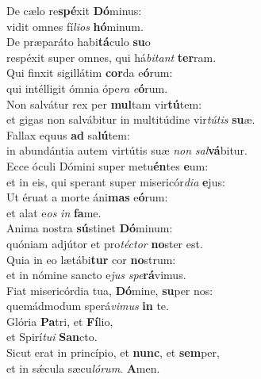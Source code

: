 \evenverse De cælo re\textbf{spé}xit \textbf{Dó}minus:~\*\\
\evenverse vidit omnes fí\textit{li}\textit{os} \textbf{hó}minum.\\
\oddverse De præparáto habi\textbf{tá}culo \textbf{su}o~\*\\
\oddverse respéxit super omnes, qui há\textit{bi}\textit{tant} \textbf{ter}ram.\\
\evenverse Qui finxit sigillátim \textbf{cor}da e\textbf{ó}rum:~\*\\
\evenverse qui intélligit ómnia ópe\textit{ra} \textit{e}\textbf{ó}rum.\\
\oddverse Non salvátur rex per \textbf{mul}tam vir\textbf{tú}tem:~\*\\
\oddverse et gigas non salvábitur in multitúdine vir\textit{tú}\textit{tis} \textbf{su}æ.\\
\evenverse Fallax equus \textbf{ad} sa\textbf{lú}tem:~\*\\
\evenverse in abundántia autem virtútis suæ \textit{non} \textit{sal}\textbf{vá}bitur.\\
\oddverse Ecce óculi Dómini super metu\textbf{én}tes \textbf{e}um:~\*\\
\oddverse et in eis, qui sperant super misericór\textit{di}\textit{a} \textbf{e}jus:\\
\evenverse Ut éruat a morte áni\textbf{mas} e\textbf{ó}rum:~\*\\
\evenverse et alat e\textit{os} \textit{in} \textbf{fa}me.\\
\oddverse Anima nostra \textbf{sú}stinet \textbf{Dó}minum:~\*\\
\oddverse quóniam adjútor et pro\textit{té}\textit{ctor} \textbf{no}ster est.\\
\evenverse Quia in eo lætábi\textbf{tur} cor \textbf{no}strum:~\*\\
\evenverse et in nómine sancto e\textit{jus} \textit{spe}\textbf{rá}vimus.\\
\oddverse Fiat misericórdia tua, \textbf{Dó}mine, \textbf{su}per nos:~\*\\
\oddverse quemádmodum sperá\textit{vi}\textit{mus} \textbf{in} te.\\
\evenverse Glória \textbf{Pa}tri, et \textbf{Fí}lio,~\*\\
\evenverse et Spirí\textit{tu}\textit{i} \textbf{San}cto.\\
\oddverse Sicut erat in princípio, et \textbf{nunc}, et \textbf{sem}per,~\*\\
\oddverse et in sǽcula sæcu\textit{ló}\textit{rum}. \textbf{A}men.\\
